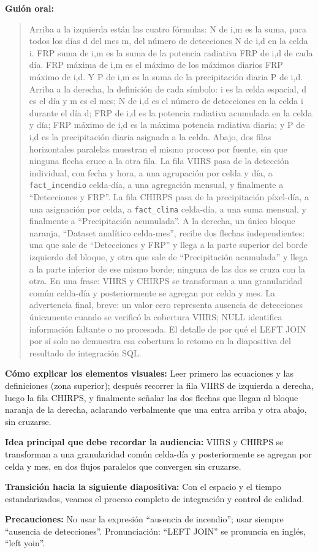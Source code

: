\documentclass[11pt,a4paper]{article}
\newcommand{\campo}[2]{\par\medskip\noindent\textbf{#1:} #2\par}
\newenvironment{guionoral}{%
  \medskip\noindent\textbf{Gui\'on oral:}\par\smallskip
  \begin{quote}\small
}{%
  \end{quote}
}
\begin{document}
\begin{guionoral}
Arriba a la izquierda est\'an las cuatro f\'ormulas: N de i,m es la
suma, para todos los d\'ias d del mes m, del n\'umero de detecciones N
de i,d en la celda i. FRP suma de i,m es la suma de la potencia
radiativa FRP de i,d de cada d\'ia. FRP m\'axima de i,m es el m\'aximo
de los m\'aximos diarios FRP m\'aximo de i,d. Y P de i,m es la suma de
la precipitaci\'on diaria P de i,d. Arriba a la derecha, la
definici\'on de cada s\'imbolo: i es la celda espacial, d es el d\'ia y
m es el mes; N de i,d es el n\'umero de detecciones en la celda i
durante el d\'ia d; FRP de i,d es la potencia radiativa acumulada en la
celda y d\'ia; FRP m\'aximo de i,d es la m\'axima potencia radiativa
diaria; y P de i,d es la precipitaci\'on diaria asignada a la celda.
Abajo, dos filas horizontales paralelas muestran el mismo proceso por
fuente, sin que ninguna flecha cruce a la otra fila. La fila VIIRS pasa
de la detecci\'on individual, con fecha y hora, a una agrupaci\'on por
celda y d\'ia, a \texttt{fact\_incendio} celda-d\'ia, a una
agregaci\'on mensual, y finalmente a ``Detecciones y FRP''. La fila
CHIRPS pasa de la precipitaci\'on p\'ixel-d\'ia, a una asignaci\'on por
celda, a \texttt{fact\_clima} celda-d\'ia, a una suma mensual, y
finalmente a ``Precipitaci\'on acumulada''. A la derecha, un \'unico
bloque naranja, ``Dataset anal\'itico celda-mes'', recibe dos flechas
independientes: una que sale de ``Detecciones y FRP'' y llega a la
parte superior del borde izquierdo del bloque, y otra que sale de
``Precipitaci\'on acumulada'' y llega a la parte inferior de ese mismo
borde; ninguna de las dos se cruza con la otra. En una frase: VIIRS y
CHIRPS se transforman a una granularidad com\'un celda-d\'ia y
posteriormente se agregan por celda y mes. La advertencia final,
breve: un valor cero representa ausencia de detecciones \'unicamente
cuando se verific\'o la cobertura VIIRS; NULL identifica informaci\'on
faltante o no procesada. El detalle de por qu\'e el LEFT JOIN por s\'i
solo no demuestra esa cobertura lo retomo en la diapositiva del
resultado de integraci\'on SQL.
\end{guionoral}

\campo{C\'omo explicar los elementos visuales}{Leer primero las
ecuaciones y las definiciones (zona superior); despu\'es recorrer la
fila VIIRS de izquierda a derecha, luego la fila CHIRPS, y finalmente
se\~nalar las dos flechas que llegan al bloque naranja de la derecha,
aclarando verbalmente que una entra arriba y otra abajo, sin cruzarse.}
\campo{Idea principal que debe recordar la audiencia}{VIIRS y CHIRPS se
transforman a una granularidad com\'un celda-d\'ia y posteriormente se
agregan por celda y mes, en dos flujos paralelos que convergen sin
cruzarse.}
\campo{Transici\'on hacia la siguiente diapositiva}{Con el espacio y el
tiempo estandarizados, veamos el proceso completo de integraci\'on y
control de calidad.}
\campo{Precauciones}{No usar la expresi\'on ``ausencia de incendio'';
usar siempre ``ausencia de detecciones''. Pronunciaci\'on: ``LEFT
JOIN'' se pronuncia en ingl\'es, ``left yoin''.}
\end{document}
